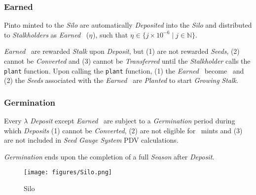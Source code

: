 \documentclass[tikz]{article}
\newcommand{\code}[1]{\texttt{#1}}
\newcommand{\term}[1]{\textsl{#1}}
\newcommand{\Pinto}{} %
\newcommand{\pinto}{} %
\begin{document}

\vspace*{1.2mm}
\subsubsection{Earned \Pinto}
\vspace*{1.2mm}

Pinto minted to the \term{Silo} are automatically \term{Deposited} into the \term{Silo} and distributed to \term{Stalkholders} as \term{Earned} \Pinto\ ($\eta^{\pinto}$), such that $\eta^{\pinto} \in \{j \times 10^{-6} \mid j \in \mathbb{N} \}$.

\vspace*{1.2mm}

\term{Earned} \Pinto\ are rewarded \term{Stalk} upon \term{Deposit}, but (1) are not rewarded \term{Seeds}, (2) cannot be \term{Converted} and (3) cannot be \term{Transferred} until the \term{Stalkholder} calls the \code{plant} function. Upon calling the \code{plant} function, (1)  the \term{Earned} \Pinto\ become \Pinto\ and (2) the \term{Seeds} associated with the \term{Earned} \Pinto\ are \term{Planted} to start \term{Growing} \term{Stalk}. 


\vspace*{1.2mm}
\subsubsection{Germination}
\vspace*{1.2mm}

Every $\lambda$ \term{Deposit} except \term{Earned} \Pinto\ are subject to a \term{Germination} period during which \term{Deposits} (1) cannot be \term{Converted}, (2) are not eligible for \Pinto\ mints and (3) are not included in \term{Seed Gauge System} PDV calculations. 

\vspace*{1.2mm}

\term{Germination} ends upon the completion of a full \term{Season} after \term{Deposit}.

\newpage


\begin{figure}[h!]
    \centering
    \texttt{[image: figures/Silo.png]}
    \vspace*{-5mm}
    \caption{Silo}
    \label{Silo}
\end{figure}
\end{document}
